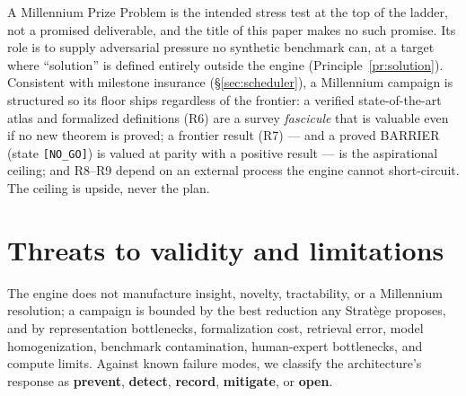 \documentclass[11pt]{amsart}
\theoremstyle{definition}
\theoremstyle{remark}
\newcommand{\state}[1]{\texttt{[#1]}}
\newcommand{\otype}[1]{\textsc{#1}}
\begin{document}
A Millennium Prize Problem is the intended stress test at the top of the ladder,
not a promised deliverable, and the title of this paper makes no such promise.
Its role is to supply adversarial pressure no synthetic benchmark can, at a
target where ``solution'' is defined entirely outside the engine
(Principle~\ref{pr:solution}). Consistent with milestone insurance
(\S\ref{sec:scheduler}), a Millennium campaign is structured so its floor ships
regardless of the frontier: a verified state-of-the-art atlas and formalized
definitions (R6) are a survey \emph{fascicule} that is valuable even if no new
theorem is proved; a frontier result (R7) --- and a proved \otype{BARRIER}
(state \state{NO\_GO}) is valued at parity with a positive result --- is the
aspirational ceiling; and R8--R9 depend on an external process the engine cannot
short-circuit. The ceiling is upside, never the plan.

\section{Threats to validity and limitations}\label{sec:threats}

The engine does not manufacture insight, novelty, tractability, or a Millennium
resolution; a campaign is bounded by the best reduction any Strat\`ege proposes,
and by representation bottlenecks, formalization cost, retrieval error, model
homogenization, benchmark contamination, human-expert bottlenecks, and compute
limits. Against known failure modes, we classify the architecture's response as
\textbf{prevent}, \textbf{detect}, \textbf{record}, \textbf{mitigate}, or
\textbf{open}.
\end{document}
